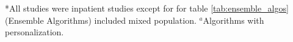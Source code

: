 \begin{table}
\begin{subtable}{\textwidth}
\end{subtable}

\vspace{0.5em}

*All studies were inpatient studies except for for table \ref{tab:ensemble_algos} (Ensemble Algorithms) included mixed population.
$^a$Algorithms with personalization.

\end{table}